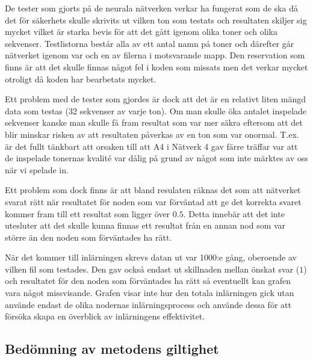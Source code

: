 \documentclass[a4paper,10pt]{article}
\begin{document}
De tester som gjorts på de neurala nätverken verkar ha fungerat som de ska då det för säkerhets skulle skrivits ut vilken ton som testats och resultaten skiljer sig mycket vilket är starka bevis för att det gått igenom olika toner och olika sekvenser. Testlistorna består alla av ett antal namn på toner och därefter går nätverket igenom var och en av filerna i motsvarande mapp. Den reservation som finns är att det skulle finnas något fel i koden som missats men det verkar mycket otroligt då koden har bearbetats mycket.\\\par
Ett problem med de tester som gjordes är dock att det är en relativt liten mängd data som testas (32 sekvenser av varje ton). Om man skulle öka antalet inspelade sekvenser kanske man skulle få fram resultat som var mer säkra eftersom att det blir minskar risken av att resultaten påverkas av en ton som var onormal. T.ex. är det fullt tänkbart att orsaken till att A4 i Nätverk 4 gav färre träffar var att de inspelade tonernas kvalité var dålig på grund av något som inte märktes av oss när vi spelade in. \par
Ett problem som dock finns är att bland resulaten räknas det som att nätverket svarat rätt när resultatet för noden som var förväntad att ge det korrekta svaret kommer fram till ett resultat som ligger över $0.5$. Detta innebär att det inte utesluter att det skulle kunna finnas ett resultat från en annan nod som var större än den noden som förväntades ha rätt. 
\\\par
När det kommer till inlärningen skrevs datan ut var 1000:e gång, oberoende av vilken fil som testades. Den gav också endast ut skillnaden mellan önskat svar ($1$) och resultatet för den noden som förväntades ha rätt så eventuellt kan grafen vara något missvisande. Grafen visar inte hur den totala inlärningen gick utan använde endast de olika nodernas inlärningsprocess och använde dessa för att försöka skapa en överblick av inlärningens effektivitet.


\subsection{Bedömning av metodens giltighet}

\end{document}
